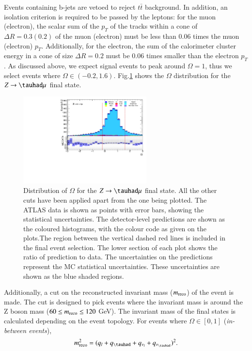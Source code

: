 Events containing b-jets are vetoed to reject $t\bar{t}$ background. In addition, an isolation criterion is required to be passed by the leptons: for the muon (electron), the scalar sum of the $p_T$ of the tracks within a cone of $\Delta R=0.3 (0.2)$ of the muon (electron) must be less than 0.06 times the muon (electron) $p_T$. Additionally, for the electron, the sum of the calorimeter cluster energy in a cone of size $\Delta R=0.2$ must be 0.06 times smaller than the electron $p_T$. As discussed above, we expect signal events to peak around $\Omega=1$, thus we select events where $\Omega\in (-0.2,1.6)$. Fig.\ref{Fig3} shows the $\Omega$ distribution for the $Z\to\tauhad\mu$ final state.
\begin{figure}[htbp]
	\centering
	\includegraphics[width=0.6\textwidth]{figures/Fig3.pdf}
	\caption{Distribution of $\Omega$ for the $Z\to\tauhad\mu$ final state. All the other cuts have been applied apart from the one being plotted. The ATLAS data is shown as points with error bars, showing the statistical uncertainties. The detector-level predictions are shown as the coloured histograms, with the colour code as given on the plots.The region between the vertical dashed red lines is included in the final event selection. The lower section of each plot shows the ratio of prediction to data. The uncertainties on the predictions represent the MC statistical uncertainties. These uncertainties are shown as the blue shaded regions.}
	\label{Fig3}
\end{figure}
Additionally, a cut on the reconstructed invariant mass ($m_{\text{reco}}$) of the event is made. The cut is designed to pick events where the invariant mass is around the Z boson mass ($60\leq m_{\text{reco}}\leq 120$ GeV). The invariant mass of the final states is calculated depending on the event topology. For events where $\Omega\in [0,1]$ (\textit{in-between events}),
\begin{equation}
\mreco^{2}=(q_l+q_{\tauhad}+q_{\nu_l}+q_{\nu_{\tauhad}})^2.
\label{eq35a}
\end{equation}
